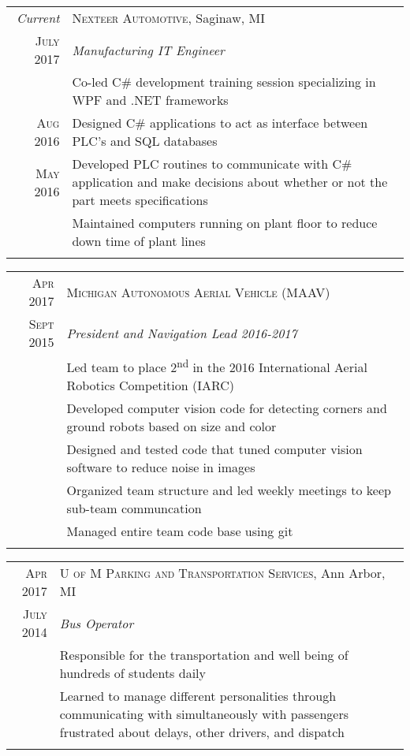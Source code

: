 \documentclass[a4paper,11pt]{article} %
\begin{document}
\begin{tabular}{r|p{13cm}}
\emph{Current} & \textsc{Nexteer Automotive}, Saginaw, MI \\
\textsc{July 2017} & \emph{Manufacturing IT Engineer} \\
& \footnotesize{Co-led C\# development training session specializing in WPF and .NET frameworks}\\
\textsc{Aug 2016} & \footnotesize{Designed C\# applications to act as interface
  between PLC's and SQL databases} \\
\textsc{May 2016} & \footnotesize{Developed PLC routines to communicate with C\#
  application and make decisions about whether or not the part meets specifications} \\
& \footnotesize{Maintained computers running on plant floor to reduce down time
  of plant lines} \\
\multicolumn{2}{c}{} \\
\end{tabular}


\begin{tabular}{r|p{13cm}}
\textsc{Apr 2017} & \textsc{Michigan Autonomous Aerial Vehicle (MAAV)} \\
\textsc{Sept 2015} & \emph{President and Navigation Lead 2016-2017} \\
& \footnotesize{Led team to place 2\textsuperscript{nd} in the 2016
  International Aerial Robotics Competition (IARC)} \\
& \footnotesize{Developed computer vision code for detecting corners and
  ground robots based on size and color} \\
& \footnotesize{Designed and tested code that tuned computer vision software to
  reduce noise in images} \\
& \footnotesize{Organized team structure and led weekly meetings to keep
  sub-team communcation} \\
& \footnotesize{Managed entire team code base using git} \\
\multicolumn{2}{c}{} \\
\end{tabular}


\begin{tabular}{r|p{13cm}}
\textsc{Apr 2017} & \textsc{U of M Parking and Transportation Services}, Ann Arbor, MI\\
\textsc{July 2014} & \emph{Bus Operator} \\
& \footnotesize{Responsible for the transportation and well being of hundreds
  of students daily} \\
& \footnotesize{Learned to manage different personalities through communicating
  with simultaneously with passengers frustrated about delays, other drivers, and dispatch} \\
\multicolumn{2}{c}{} \\
\end{tabular}
\end{document}
